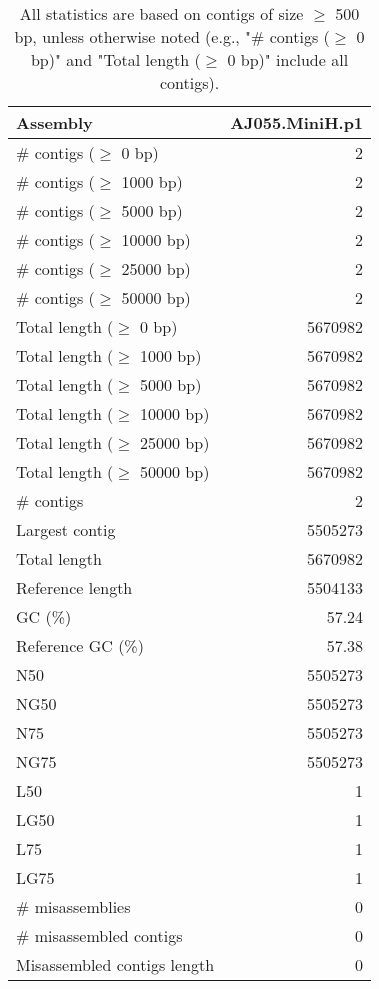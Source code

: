 \documentclass[12pt,a4paper]{article}
\begin{document}
\begin{table}[ht]
\begin{center}
\caption{All statistics are based on contigs of size $\geq$ 500 bp, unless otherwise noted (e.g., "\# contigs ($\geq$ 0 bp)" and "Total length ($\geq$ 0 bp)" include all contigs).}
\begin{tabular}{|l*{1}{|r}|}
\hline
Assembly & AJ055.MiniH.p1 \\ \hline
\# contigs ($\geq$ 0 bp) & 2 \\ \hline
\# contigs ($\geq$ 1000 bp) & 2 \\ \hline
\# contigs ($\geq$ 5000 bp) & 2 \\ \hline
\# contigs ($\geq$ 10000 bp) & 2 \\ \hline
\# contigs ($\geq$ 25000 bp) & 2 \\ \hline
\# contigs ($\geq$ 50000 bp) & 2 \\ \hline
Total length ($\geq$ 0 bp) & 5670982 \\ \hline
Total length ($\geq$ 1000 bp) & 5670982 \\ \hline
Total length ($\geq$ 5000 bp) & 5670982 \\ \hline
Total length ($\geq$ 10000 bp) & 5670982 \\ \hline
Total length ($\geq$ 25000 bp) & 5670982 \\ \hline
Total length ($\geq$ 50000 bp) & 5670982 \\ \hline
\# contigs & 2 \\ \hline
Largest contig & 5505273 \\ \hline
Total length & 5670982 \\ \hline
Reference length & 5504133 \\ \hline
GC (\%) & 57.24 \\ \hline
Reference GC (\%) & 57.38 \\ \hline
N50 & 5505273 \\ \hline
NG50 & 5505273 \\ \hline
N75 & 5505273 \\ \hline
NG75 & 5505273 \\ \hline
L50 & 1 \\ \hline
LG50 & 1 \\ \hline
L75 & 1 \\ \hline
LG75 & 1 \\ \hline
\# misassemblies & 0 \\ \hline
\# misassembled contigs & 0 \\ \hline
Misassembled contigs length & 0 \\ \hline

\end{tabular}
\end{center}
\end{table}
\end{document}
